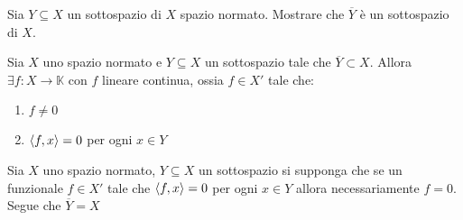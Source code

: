 \begin{eser}{}
    Sia \(Y \subseteq X \) un sottospazio di \(X\) spazio normato. Mostrare che
    \(\overline{Y}\) è un sottospazio di \(X\).
\end{eser}
\begin{lemmao}{}
    Sia \(X\) uno spazio normato e \(Y \subseteq X \) un sottospazio tale che
    \(\overline{Y} \subset X \). Allora \(\exists f : X \to \mathbb{K}\) con \(f\) lineare continua, ossia \(f \in X'\) tale che:
\begin{enumerate}[label = \arabic*.]
    \item \(f \neq 0\) 
    \item \({\left\langle f, x\right\rangle} = 0\) per ogni \(x \in Y\) 
\end{enumerate}
\end{lemmao}
\begin{remark}{}
    Sia \(X\) uno spazio normato, \(Y \subseteq X \) un sottospazio si supponga
    che se un funzionale \(f \in X'\) tale che \({\left\langle f, x\right\rangle} = 0\) per ogni \(x \in Y\) allora necessariamente \(f = 0\). Segue che \(\overline{Y} = X\) 
\end{remark}

